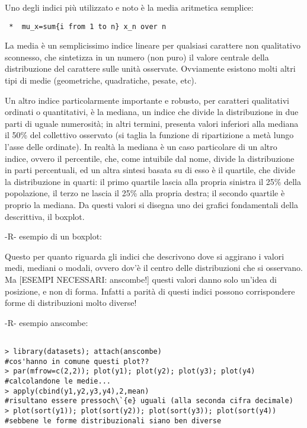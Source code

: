 \documentclass{book}
\begin{document}
Uno degli indici più utilizzato e noto \`{e} la media aritmetica semplice:

\begin{verbatim}
 *	mu_x=sum{i from 1 to n} x_n over n
\end{verbatim}

La media \`{e} un semplicissimo indice lineare per qualsiasi carattere non qualitativo sconnesso, che sintetizza in un numero (non puro) il valore centrale della distribuzione del carattere sulle unit\`{a} osservate. Ovviamente esistono molti altri tipi di medie (geometriche, quadratiche, pesate, etc).

Un altro indice particolarmente importante e robusto, per caratteri qualitativi ordinati o quantitativi, \`{e} la mediana, un indice che divide la distribuzione in due parti di uguale numerosit\`{a}; in altri termini, presenta valori inferiori alla mediana il 50\% del collettivo osservato (si taglia la funzione di ripartizione a met\`{a} lungo l'asse delle ordinate).
In realt\`{a} la mediana \`{e} un caso particolare di un altro indice, ovvero il percentile, che, come intuibile dal nome, divide la distribuzione in parti percentuali, ed un altra sintesi basata su di esso \`{e} il quartile, che divide la distribuzione in quarti: il primo quartile lascia alla propria sinistra il 25\% della popolazione, il terzo ne lascia il 25\% alla propria destra; il secondo quartile \`{e} proprio la mediana.
Da questi valori si disegna uno dei grafici fondamentali della descrittiva, il boxplot.

	-R-
esempio di un boxplot:

\lstset{language=R}


Questo per quanto riguarda gli indici che descrivono dove si aggirano i valori medi, mediani o modali, ovvero dov'\`{e} il centro delle distribuzioni che si osservano. Ma [ESEMPI NECESSARI: anscombe!] questi valori danno solo un'idea di posizione, e non di forma. Infatti a parit\`{a} di questi indici possono corrispondere forme di distribuzioni molto diverse!

	-R-
esempio anscombe:

\begin{verbatim}

> library(datasets); attach(anscombe)
#cos'hanno in comune questi plot??
> par(mfrow=c(2,2)); plot(y1); plot(y2); plot(y3); plot(y4)
#calcolandone le medie...
> apply(cbind(y1,y2,y3,y4),2,mean)
#risultano essere pressoch\`{e} uguali (alla seconda cifra decimale)
> plot(sort(y1)); plot(sort(y2)); plot(sort(y3)); plot(sort(y4))
#sebbene le forme distribuzionali siano ben diverse

\end{verbatim}
\end{document}
